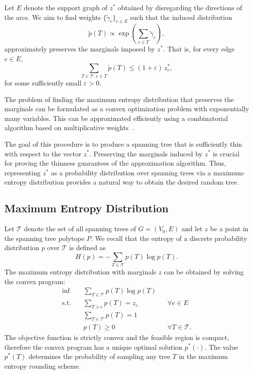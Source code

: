 \documentclass[12pt]{report}
\theoremstyle{definition}
\begin{document}
Let $E$ denote the support graph of $z^*$ obtained by disregarding the directions of the arcs. We aim to find weights $\{\tilde{\gamma}_e\}_{e\in E}$ such that the induced distribution
\begin{equation}
\tilde p(T) \propto 
\exp\!\left(\sum_{e\in T} \tilde{\gamma}_e\right),
\end{equation}
approximately preserves the marginals imposed by $z^*$. That is, for every edge $e \in E$,
\begin{equation}
\sum_{T \in \mathcal{T} : e \in T} \tilde p(T)
\le (1+\varepsilon)\, z^*_e,
\end{equation}
for some sufficiently small $\varepsilon > 0$.

The problem of finding the maximum entropy distribution that preserves the marginals can be formulated as a convex optimization problem with exponentially many variables. This can be approximated efficiently using a combinatorial algorithm based on multiplicative weights~\cite{asadpour}.

The goal of this procedure is to produce a spanning tree that is sufficiently thin with respect to the vector $z^*$. Preserving the marginals induced by $z^*$ is crucial for proving the thinness guarantees of the approximation algorithm. Thus, representing $z^*$ as a probability distribution over spanning trees via a maximum-entropy distribution provides a natural way to obtain the desired random tree.

\subsection{Maximum Entropy Distribution}

Let $\mathcal{T}$ denote the set of all spanning trees of 
$G=(V_0,E)$ and let $z$ be a point in the spanning tree polytope $P$. We recall that the entropy of a discrete probability distribution $p$ over $\mathcal{T}$ is defined as
\begin{equation}
H(p) = -\sum_{T \in \mathcal{T}} p(T)\log p(T).
\label{entropy_formula}
\end{equation}
The maximum entropy distribution with marginals $z$ can be obtained by solving the convex program:
\begin{align}
\inf \quad & \sum_{T\in\mathcal T} p(T)\log p(T) \\
\text{s.t.}\quad 
& \sum_{T\ni e} p(T)=z_e && \forall e\in E \\
& \sum_{T\in\mathcal T} p(T)=1 \\
& p(T)\ge0 && \forall T\in\mathcal T .
\end{align}
The objective function is strictly convex and the feasible region is compact, therefore the convex program has a unique optimal solution $p^*(\cdot)$. The value $p^*(T)$ determines the probability of sampling any tree $T$ in the maximum entropy rounding scheme.  
\end{document}
